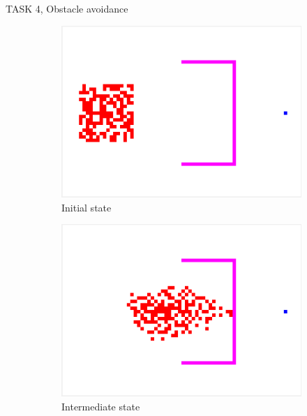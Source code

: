 \documentclass[10pt,a4paper]{article}
\begin{document}
\begin{task}{TASK 4, Obstacle avoidance}
\begin{figure}[htbp]
  \centering
  \begin{subfigure}[b]{0.31\textwidth}
    \includegraphics[width=\textwidth]{pictures/Task4_initial_cr.png}
    \caption{Initial state}
    \label{fig:Task4_initial_cr}
  \end{subfigure}
  \begin{subfigure}[b]{0.31\textwidth}
    \includegraphics[width=\textwidth]{pictures/Task4_intermediate_cr.png}
    \caption{Intermediate state}
    \label{fig:Task4_intermediate_cr}
  \end{subfigure}
  \begin{subfigure}[b]{0.31\textwidth}

\end{subfigure}
\end{figure}
\end{task}
\end{document}
